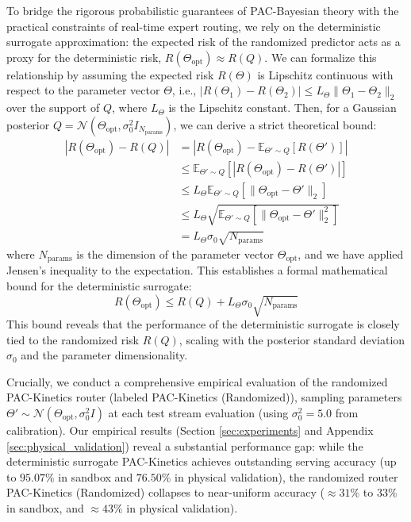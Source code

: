 To bridge the rigorous probabilistic guarantees of PAC-Bayesian theory with the practical constraints of real-time expert routing, we rely on the deterministic surrogate approximation: the expected risk of the randomized predictor acts as a proxy for the deterministic risk, $R(\Theta_{\text{opt}}) \approx R(Q)$. We can formalize this relationship by assuming the expected risk $R(\Theta)$ is Lipschitz continuous with respect to the parameter vector $\Theta$, i.e., $|R(\Theta_1) - R(\Theta_2)| \le L_{\Theta} \|\Theta_1 - \Theta_2\|_2$ over the support of $Q$, where $L_{\Theta}$ is the Lipschitz constant. Then, for a Gaussian posterior $Q = \mathcal{N}(\Theta_{\text{opt}}, \sigma_0^2 I_{N_{\text{params}}})$, we can derive a strict theoretical bound:
\begin{align}
    |R(\Theta_{\text{opt}}) - R(Q)| &= \left| R(\Theta_{\text{opt}}) - \mathbb{E}_{\Theta' \sim Q}[R(\Theta')] \right| \nonumber \\
    &\le \mathbb{E}_{\Theta' \sim Q}[|R(\Theta_{\text{opt}}) - R(\Theta')|] \nonumber \\
    &\le L_{\Theta} \mathbb{E}_{\Theta' \sim Q}[\|\Theta_{\text{opt}} - \Theta'\|_2] \nonumber \\
    &\le L_{\Theta} \sqrt{\mathbb{E}_{\Theta' \sim Q}[\|\Theta_{\text{opt}} - \Theta'\|_2^2]} \nonumber \\
    &= L_{\Theta} \sigma_0 \sqrt{N_{\text{params}}}
\end{align}
where $N_{\text{params}}$ is the dimension of the parameter vector $\Theta_{\text{opt}}$, and we have applied Jensen's inequality to the expectation. This establishes a formal mathematical bound for the deterministic surrogate:
\begin{equation}
    R(\Theta_{\text{opt}}) \le R(Q) + L_{\Theta} \sigma_0 \sqrt{N_{\text{params}}}
\end{equation}
This bound reveals that the performance of the deterministic surrogate is closely tied to the randomized risk $R(Q)$, scaling with the posterior standard deviation $\sigma_0$ and the parameter dimensionality.

Crucially, we conduct a comprehensive empirical evaluation of the randomized PAC-Kinetics router (labeled \textsf{PAC-Kinetics (Randomized)}), sampling parameters $\Theta' \sim \mathcal{N}(\Theta_{\text{opt}}, \sigma_0^2 I)$ at each test stream evaluation (using $\sigma_0^2 = 5.0$ from calibration). Our empirical results (Section \ref{sec:experiments} and Appendix \ref{sec:physical_validation}) reveal a substantial performance gap: while the deterministic surrogate \textsf{PAC-Kinetics} achieves outstanding serving accuracy (up to $95.07\%$ in sandbox and $76.50\%$ in physical validation), the randomized router \textsf{PAC-Kinetics (Randomized)} collapses to near-uniform accuracy ($\approx 31\%$ to $33\%$ in sandbox, and $\approx 43\%$ in physical validation). 

